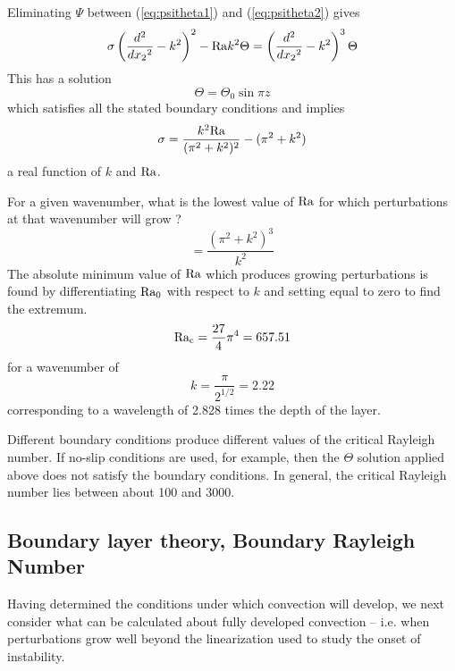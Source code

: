 \documentclass[10pt]{article}
\begin{document}
		Eliminating $\Psi$ between (\ref{eq:psitheta1}) and (\ref{eq:psitheta2}) gives
			\begin{equation}
				\sigma \left(\frac{d^2}{d {x_2}^2 } - k^2 \right)^2 -{\rm Ra} k^2 \Theta = 
				\left(\frac{d^2}{d {x_2}^2} -k^2 \right)^3 \Theta
			\end{equation}
		This has a solution 
			\begin{equation}
				\Theta = \Theta_0 \sin \pi z
			\end{equation}
		which satisfies all the stated boundary conditions and implies
			\begin{equation}
				\sigma =  \frac{k^2 {\rm Ra}}{(\pi^2 + k^2)^2} -(\pi^2 + k^2)
			\end{equation}
		a real function of $k$ and $\rm Ra$.	
	
		For a given wavenumber,
		what is the lowest value of $\rm Ra$ for which perturbations at that
		wavenumber will grow ? 
			\begin{equation}
				= \frac{(\pi^2 + k^2)^3}{k^2}
			\end{equation}
		The absolute minimum value of ${\rm Ra}$ which produces growing perturbations
		is found by differentiating ${\rm Ra_0} $ with respect to $k$ and 
		setting equal to zero to find the extremum.
			\begin{equation}
				{\rm Ra_c} = \frac{27}{4} \pi^4 = 657.51
			\end{equation}
		for a wavenumber of 
			\begin{equation}
				k = \frac{\pi}{2^{1/2}} = 2.22
			\end{equation}	
		corresponding to a wavelength of 2.828 times the depth of the layer.
		
		Different boundary conditions produce different values of the critical Rayleigh number.
		If no-slip conditions are used, for example, then the $\Theta$ solution applied
		above does not satisfy the boundary conditions. In general, the critical Rayleigh
		number lies between about 100 and 3000.	
			
\subsection{Boundary layer theory, Boundary Rayleigh Number}
	
	Having determined the conditions under which convection will develop,
	we next consider what can be calculated about fully developed convection --
	i.e. when perturbations grow well beyond the linearization used
	to study the onset of instability.
	
\end{document}
